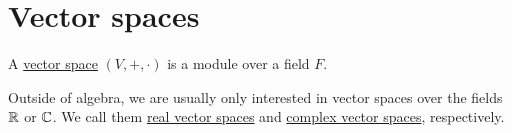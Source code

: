 \section{Vector spaces}\label{sec:vector_spaces}

\begin{definition}\label{def:vector_space}
  A \ul{vector space} $(V, +, \cdot)$ is a module over a field $F$.
\end{definition}

\begin{note}\label{note:real_vector_space}
  Outside of algebra, we are usually only interested in vector spaces over the fields $\mathbb R$ or $\mathbb C$. We call them \ul{real vector spaces} and \ul{complex vector spaces}, respectively.
\end{note}
